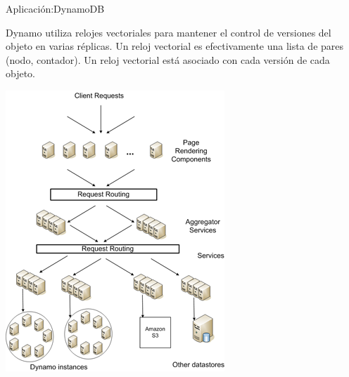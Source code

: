 \begin{frame}[fragile]{Aplicación:}{DynamoDB}
    \justifying

    Dynamo utiliza relojes vectoriales para mantener el control de versiones del
    objeto en varias réplicas. Un reloj vectorial es efectivamente una lista de
    pares (nodo, contador). Un reloj vectorial está asociado con cada versión de
    cada objeto.

    \begin{center}
        \includegraphics[scale=0.4]{D2.png}
        \end{center}

\end{frame}
